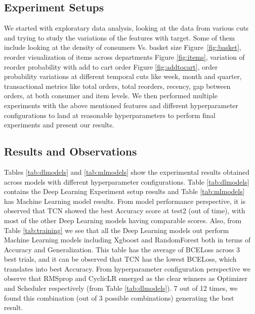\subsection{Experiment Setups}
We started with exploratary data analysis, looking at the data from various cuts and 
trying to study the variations of the features with target. Some of them include looking at the 
density of consumers Vs. basket size Figure~\ref{fig:basket}, reorder visualization of items 
across departments Figure \ref{fig:items}, variation of reorder probability with add to cart order Figure \ref{fig:addtocart},
order probability variations at different temporal cuts like week, month and quarter, transactional metrics 
like total orders, total reorders, recency, gap between orders, at both consumer and item levels.
We then performed multiple experiments with the above mentioned features and different hyperparameter configurations to land at reasonable 
hyperparameters to perform final experiments and present our results.

\subsection{Results and Observations}
Tables \ref{tab:dlmodels} and \ref{tab:mlmodels} show the experimental results obtained across models with different 
hyperparameter configurations. Table \ref{tab:dlmodels} contains the Deep Learning Experiment setup results
and Table \ref{tab:mlmodels} has Machine Learning model results. From model performance perspective, it is observed that 
TCN showed the best Accuracy score at test2 (out of time), with most of the other Deep Learning models having comparable scores.
Also, from Table \ref{tab:training} we see that all the Deep Learning models out perform Machine Learning models 
including Xgboost and RandomForest both in terms of Accuracy and Generalization. This table has the average of 
BCELoss across 3 best trials, and it can be observed that TCN has the lowest BCELoss, which translates into
best Accuracy. From hyperparameter configuration perspective we observe that RMSprop and CyclicLR emerged as the 
clear winners as Optimizer and Scheduler respectively (from Table \ref{tab:dlmodels}). 7 out of 12 times, we 
found this combination (out of 3 possible combinations) generating the best result.

